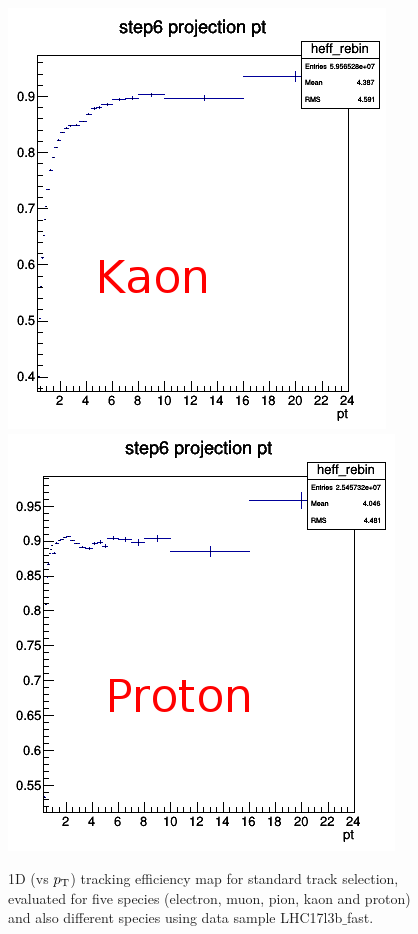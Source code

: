\begin{figure}[h]
    \includegraphics[width=0.4\linewidth]{figures/Effs/TrackEff_1D_k.png}
    \includegraphics[width=0.4\linewidth]{figures/Effs/TrackEff_1D_p.png}
	\caption{1D (vs $p_{\rm T}$) tracking efficiency map for standard track selection, evaluated for five species (electron, muon, pion, kaon and proton) and also different species using data sample LHC17l3b$\_$fast.}
	\label{fig:trackeff}	
\end{figure}

